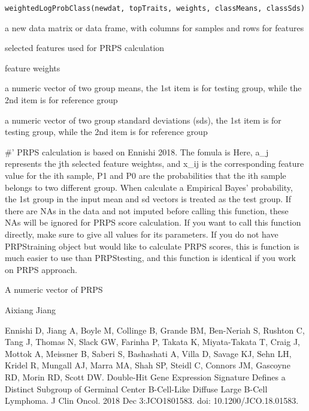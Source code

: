 \documentclass[letterpaper]{book}
\begin{document}
%
\begin{Usage}
\begin{verbatim}
weightedLogProbClass(newdat, topTraits, weights, classMeans, classSds)
\end{verbatim}
\end{Usage}
%
\begin{Arguments}
\begin{ldescription}
\item[\code{newdat}] a new data matrix or data frame, with columns for samples and rows for features

\item[\code{topTraits}] selected features used for PRPS calculation

\item[\code{weights}] feature weights

\item[\code{classMeans}] a numeric vector of two group means, the 1st item is for testing group, 
while the 2nd item is for reference group

\item[\code{classSds}] a numeric vector of two group standard deviations (sds), the 1st item is for testing group, 
while the 2nd item is for reference group
\end{ldescription}
\end{Arguments}
%
\begin{Details}\relax
\#'  PRPS calculation is based on Ennishi 2018. The fomula is 
Here, a\_j represents the jth selected feature weightss, and x\_ij is the corresponding feature value for the ith sample, P1 and P0 are the probabilities that the ith sample belongs to two different group.
When calculate a Empirical Bayes' probability, the 1st group in the input mean and sd vectors is treated as
the test group. 
If there are NAs in the data and not imputed before calling this function, these NAs will be ignored for PRPS score calculation.
If you want to call this function directly, make sure to give all values for its parameters. If you do not have PRPStraining object
but would like to calculate PRPS scores, this is function is much easier to use than PRPStesting, and this function is 
identical if you work on PRPS approach.
\end{Details}
%
\begin{Value}
A numeric vector of PRPS
\end{Value}
%
\begin{Author}\relax
Aixiang Jiang
\end{Author}
%
\begin{References}\relax
Ennishi D, Jiang A, Boyle M, Collinge B, Grande BM, Ben-Neriah S, Rushton C, Tang J, Thomas N, Slack GW, Farinha P, 
Takata K, Miyata-Takata T, Craig J, Mottok A, Meissner B, Saberi S, Bashashati A, Villa D, Savage KJ, Sehn LH, Kridel R, 
Mungall AJ, Marra MA, Shah SP, Steidl C, Connors JM, Gascoyne RD, Morin RD, Scott DW. Double-Hit Gene Expression Signature Defines
a Distinct Subgroup of Germinal Center B-Cell-Like Diffuse Large B-Cell Lymphoma. J Clin Oncol. 
2018 Dec 3:JCO1801583. doi: 10.1200/JCO.18.01583.
\end{References}
\printindex{}
\end{document}
